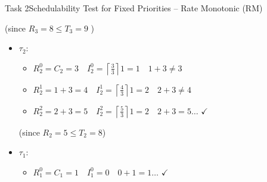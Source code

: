 \begin{frame}[allowframebreaks]{Task 2}{Schedulability Test for Fixed Priorities – Rate Monotonic (RM)}
\begin{solutionnoinc}
\begin{itemize}
\begin{itemize}
        (since $R_3=8 \leq T_3=9$ )
      \end{itemize}
    \end{itemize}
  \end{solutionnoinc}
  \begin{solution}
    \begin{itemize}
      \item $\tau_2$:
        \begin{itemize}
          \item $R_2^0=C_2=3 \quad I_2^0=\left\lceil\frac{3}{3}\right\rceil 1=1 \quad 1+3 \neq 3$
          \item $R_2^1=1+3=4 \quad I_2^1=\left\lceil\frac{4}{3}\right\rceil 1=2 \quad 2+3 \neq 4$
          \item $R_2^2=2+3=5 \quad I_2^2=\left\lceil\frac{5}{3}\right\rceil 1=2 \quad 2+3=5 \ldots$ $\checkmark$
        \end{itemize}

          (since $R_2=5 \leq T_2=8$)
      \item $\tau_1$:
        \begin{itemize}
          \item $R_1^0=C_1=1 \quad I_1^0=0 \quad 0+1=1 \ldots$ $\checkmark$
        \end{itemize}


\end{itemize}
\end{solution}
\end{frame}
